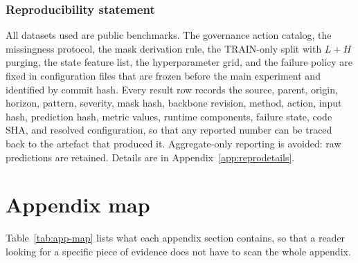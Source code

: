 \documentclass{article}
\newcommand{\ph}[1]{\textcolor{phgray}{\textsf{[#1]}}}
\begin{document}
\subsubsection*{Reproducibility statement}
All datasets used are public benchmarks. The governance action catalog, the missingness
protocol, the mask derivation rule, the TRAIN-only split with $L+H$ purging, the state
feature list, the hyperparameter grid, and the failure policy are fixed in configuration
files that are frozen before the main experiment and identified by commit hash. Every
result row records the source, parent, origin, horizon, pattern, severity, mask hash,
backbone revision, method, action, input hash, prediction hash, metric values, runtime
components, failure state, code SHA, and resolved configuration, so that any reported
number can be traced back to the artefact that produced it. Aggregate-only reporting is
avoided: raw predictions are retained. Details are in Appendix~\ref{app:reprodetails}.




\appendix
\newpage

\section*{Appendix map}
\label{app:map}
Table~\ref{tab:app-map} lists what each appendix section contains, so that a reader looking
for a specific piece of evidence does not have to scan the whole appendix.
\end{document}
